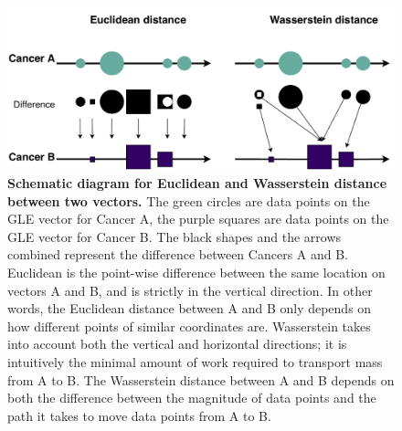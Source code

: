 \begin{figure}[h!]
    \centering
    \includegraphics[scale=0.8]{graphics/wasserstein_demo.pdf}
    \caption{\textbf{Schematic diagram for Euclidean and Wasserstein distance between two vectors.} The green circles are data points on the GLE vector for Cancer A, the purple squares are data points on the GLE vector for Cancer B. The black shapes and the arrows combined represent the difference between Cancers A and B. Euclidean is the point-wise difference between the same location on vectors A and B, and is strictly in the vertical direction. In other words, the Euclidean distance between A and B only depends on how different points of similar coordinates are. Wasserstein takes into account both the vertical and horizontal directions; it is intuitively the minimal amount of work required to transport mass from A to B. The Wasserstein distance between A and B depends on both the difference between the magnitude of data points and the path it takes to move data points from A to B.}
    \label{fig:wasserstein_demo}
\end{figure}
